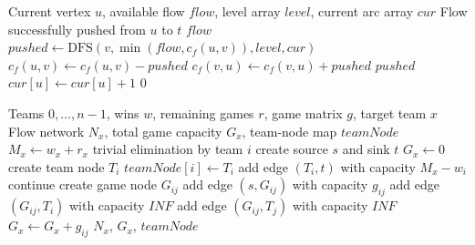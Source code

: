 \documentclass[UTF8,fontset=none]{ctexart}
\begin{document}
\begin{algorithm}[H]
\caption{DFS in Dinic Level Graph}
\begin{algorithmic}[1]
\Require Current vertex $u$, available flow $flow$, level array $level$, current arc array $cur$
\Ensure Flow successfully pushed from $u$ to $t$
    \State \Return $flow$
\EndIf
{}
        \State $pushed \gets \text{DFS}(v,\min(flow,c_f(u,v)), level, cur)$
            \State $c_f(u,v) \gets c_f(u,v)-pushed$
            \State $c_f(v,u) \gets c_f(v,u)+pushed$
            \State \Return $pushed$
        \EndIf
    \EndIf
    \State $cur[u] \gets cur[u]+1$
\EndFor
\State \Return $0$
\end{algorithmic}
\end{algorithm}


\begin{algorithm}[H]
\caption{Build Baseball Flow Network}
\begin{algorithmic}[1]
\Require Teams $0,\dots,n-1$, wins $w$, remaining games $r$, game matrix $g$, target team $x$
\Ensure Flow network $N_x$, total game capacity $G_x$, team-node map $teamNode$
\State $M_x \gets w_x + r_x$
        \State \Return trivial elimination by team $i$
    \EndIf
\EndFor
\State create source $s$ and sink $t$
\State $G_x \gets 0$
    \State create team node $T_i$
    \State $teamNode[i] \gets T_i$
    \State add edge $(T_i,t)$ with capacity $M_x-w_i$
\EndFor
{}
        \State continue
    \EndIf
    \State create game node $G_{ij}$
    \State add edge $(s,G_{ij})$ with capacity $g_{ij}$
    \State add edge $(G_{ij},T_i)$ with capacity $INF$
    \State add edge $(G_{ij},T_j)$ with capacity $INF$
    \State $G_x \gets G_x + g_{ij}$
\EndFor
\State \Return $N_x$, $G_x$, $teamNode$
\end{algorithmic}
\end{algorithm}
\end{document}
